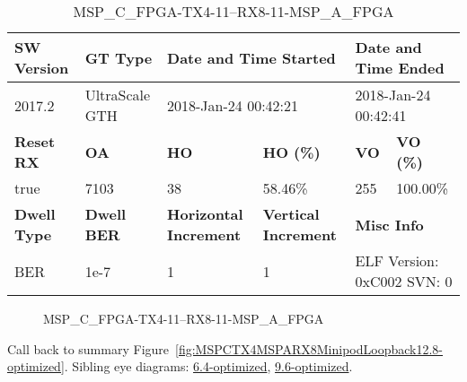 \begin{table}[h]
\centering
\caption{MSP\_C\_FPGA-TX4-11--RX8-11-MSP\_A\_FPGA}
\label{tab:MSPCFPGATX411RX811MSPAFPGA12.8-optimized}
\begin{tabular}{@{}|l|l|l|l|l|l|@{}}
\toprule
\textbf{SW Version}                & \textbf{GT Type}   & \multicolumn{2}{l|}{\textbf{Date and Time Started}}            & \multicolumn{2}{l|}{\textbf{Date and Time Ended}}        \\ \midrule
2017.2                       & UltraScale GTH          & \multicolumn{2}{l|}{2018-Jan-24 00:42:21}                   & \multicolumn{2}{l|}{2018-Jan-24 00:42:41}               \\ \midrule
\textbf{Reset RX}                  & \textbf{OA} & \textbf{HO}   & \textbf{HO (\%)} & \textbf{VO} & \textbf{VO (\%)} \\ \midrule
true & 7103        & 38          & 58.46\%        & 255        & 100.00\%       \\ \midrule
\textbf{Dwell Type}                & \textbf{Dwell BER} & \textbf{Horizontal Increment} & \textbf{Vertical Increment}    & \multicolumn{2}{l|}{\textbf{Misc Info}}                  \\ \midrule
BER                            & 1e-7        & 1        & 1           & \multicolumn{2}{l|}{ELF Version: 0xC002 SVN: 0}                         \\ \bottomrule
\end{tabular}
\end{table}

\begin{figure}[h]
\caption{MSP\_C\_FPGA-TX4-11--RX8-11-MSP\_A\_FPGA} \label{fig:MSPCFPGATX411RX811MSPAFPGA12.8-optimized}
\end{figure}

Call back to summary Figure~\ref{fig:MSPCTX4MSPARX8MinipodLoopback12.8-optimized}.
Sibling eye diagrams: \hyperref[sec:MSPCFPGATX411RX811MSPAFPGA6.4-optimized]{6.4-optimized}, \hyperref[sec:MSPCFPGATX411RX811MSPAFPGA9.6-optimized]{9.6-optimized}.

\clearpage
\newpage

